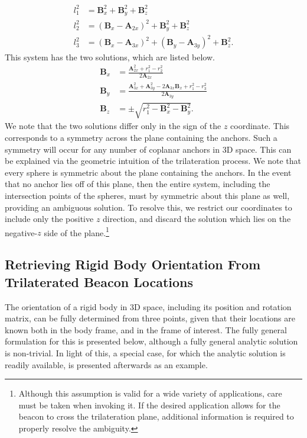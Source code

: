\documentclass{report}
\begin{document}
				\begin{align}
					l_1^2&=\mathbf{B}_x^2+\mathbf{B}_y^2+\mathbf{B}_z^2 \\
					l_2^2&=(\mathbf{B}_x-\mathbf{A}_{2x})^2+\mathbf{B}_y^2+\mathbf{B}_z^2 \\
					l_3^2&=(\mathbf{B}_x-\mathbf{A}_{3x})^2+(\mathbf{B}_y-\mathbf{A}_{3y})^2+\mathbf{B}_z^2.
				\end{align}
				This system has the two solutions, which are listed below.
				\begin{align}
					\mathbf{B}_x&=\frac{\mathbf{A}_{2x}^2+r_1^2-r_2^2}{2\mathbf{A}_{2x}} \\
					\mathbf{B}_y&=\frac{\mathbf{A}_{3x}^2+\mathbf{A}_{3y}^2-2\mathbf{A}_{3x}\mathbf{B}_x+r_1^2-r_3^2}{2\mathbf{A}_{3y}} \\
					\mathbf{B}_z&=\pm\sqrt{r_1^2-\mathbf{B}_x^2-\mathbf{B}_y^2}.
				\end{align}
				We note that the two solutions differ only in the sign of the $z$ coordinate. This corresponds to a symmetry across the plane containing the anchors. Such a symmetry will occur for any number of coplanar anchors in 3D space. This can be explained via the geometric intuition of the trilateration process. We note that every sphere is symmetric about the plane containing the anchors. In the event that no anchor lies off of this plane, then the entire system, including the intersection points of the spheres, must by symmetric about this plane as well, providing an ambiguous solution. To resolve this, we restrict our coordinates to include only the positive $z$ direction, and discard the solution which lies on the negative-$z$ side of the plane.\footnote{Although this assumption is valid for a wide variety of applications, care must be taken when invoking it. If the desired application allows for the beacon to cross the trilateration plane, additional information is required to properly resolve the ambiguity.}
			\subsection{Retrieving Rigid Body Orientation From Trilaterated Beacon Locations}
				The orientation of a rigid body in 3D space, including its position and rotation matrix, can be fully determined from three points, given that their locations are known both in the body frame, and in the frame of interest. The fully general formulation for this is presented below, although a fully general analytic solution is non-trivial. In light of this, a special case, for which the analytic solution is readily available, is presented afterwards as an example.
\end{document}
